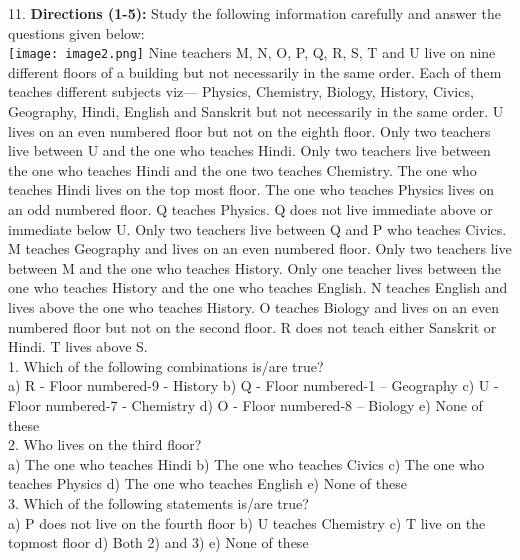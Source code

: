 \documentclass[
]{article}
\begin{document}
11. \textbf{Directions (1-5):} Study the following information carefully and answer the questions given
below:\\
\texttt{[image: image2.png]}
Nine teachers M, N, O, P, Q, R, S, T and U live on nine different floors of a building but not
necessarily in the same order. Each of them teaches different subjects viz— Physics,
Chemistry, Biology, History, Civics, Geography, Hindi, English and Sanskrit but not
necessarily in the same order.
U lives on an even numbered floor but not on the eighth floor. Only two teachers live
between U and the one who teaches Hindi. Only two teachers live between the one who
teaches Hindi and the one two teaches Chemistry. The one who teaches Hindi lives on the
top most floor. The one who teaches Physics lives on an odd numbered floor. Q teaches
Physics. Q does not live immediate above or immediate below U. Only two teachers live
between Q and P who teaches Civics. M teaches Geography and lives on an even numbered
floor. Only two teachers live between M and the one who teaches History. Only one teacher
lives between the one who teaches History and the one who teaches English. N teaches
English and lives above the one who teaches History. O teaches Biology and lives on an
even numbered floor but not on the second floor. R does not teach either Sanskrit or Hindi.
T lives above S.\\

1. Which of the following combinations is/are true?\\
a) R - Floor numbered-9 - History \hspace{2mm}b) Q - Floor numbered-1 – Geography
\hspace{2mm}c) U - Floor numbered-7 - Chemistry \hspace{2mm}d) O - Floor numbered-8 – Biology
\hspace{2mm}e) None of these\\

2. Who lives on the third floor?\\
a) The one who teaches Hindi \hspace{2mm}b) The one who teaches Civics
\hspace{2mm}c) The one who teaches Physics \hspace{2mm}d) The one who teaches English
\hspace{2mm}e) None of these\\

3. Which of the following statements is/are true?\\
a) P does not live on the fourth floor \hspace{2mm}b) U teaches Chemistry
\hspace{2mm}c) T live on the topmost floor \hspace{2mm}d) Both 2) and 3)
e) None of these\\
\end{document}
